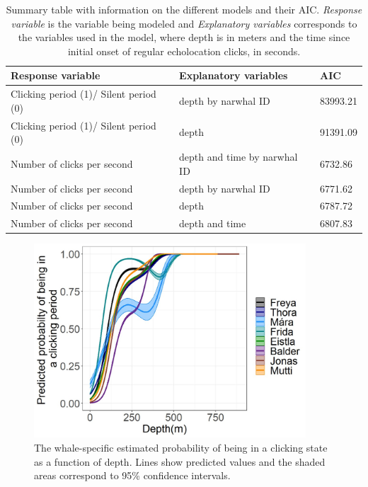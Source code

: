 \documentclass[preprint]{JASA}
\begin{document}
\begin{table}[ht]
\caption{\label{tab:TAB2}{Summary table with information on the different models and their AIC. \textit{Response variable} is the variable being modeled and \textit{Explanatory variables} corresponds to the variables used in the model, where depth is in meters and the time since initial onset of regular echolocation clicks, in seconds.}}
\vskip3pt
\begin{tabular}{p{8.5cm}p{5.5cm}p{2cm}}

\hline\hline
 Response variable & Explanatory variables & AIC\\
\hline
Clicking period (1)/ Silent period (0) & depth by narwhal ID & 83993.21\\
Clicking period (1)/ Silent period (0) & depth & 91391.09\\
\hline
Number of clicks per second & depth and time by narwhal ID  & 6732.86\\
Number of clicks per second & depth by narwhal ID & 6771.62\\
Number of clicks per second & depth & 6787.72\\
Number of clicks per second & depth and time & 6807.83\\
\hline\hline
\end{tabular}
\end{table}

\begin{figure}[t]
\includegraphics[width=4in]{Figure4}%
\caption{\label{fig:FIG4}{The whale-specific estimated probability of being in a clicking state as a function of depth. Lines show predicted values and the shaded areas correspond to 95\% confidence intervals.
}}
\raggedright

\end{figure}
\end{document}
